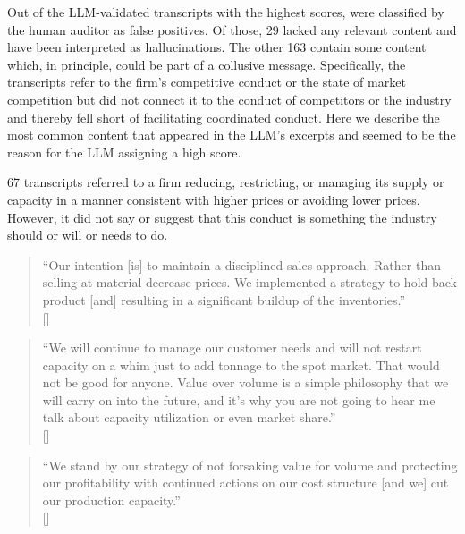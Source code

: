 Out of the  LLM-validated transcripts with the highest scores,  were classified by the human auditor as false positives. Of those, 29 lacked any relevant content and have been interpreted as hallucinations. The other 163 contain some content which, in principle, could be part of a collusive message. Specifically, the transcripts refer to the firm's competitive conduct or the state of market competition but did not connect it to the conduct of competitors or the industry and thereby fell short of facilitating coordinated conduct. Here we describe the most common content that appeared in the LLM's excerpts and seemed to be the reason for the LLM assigning a high score.

67 transcripts referred to a firm reducing, restricting, or managing its supply or capacity in a manner consistent with higher prices or avoiding lower prices. However, it did not say or suggest that this conduct is something the industry should or will or needs to do.

\begin{quote}
``Our intention [is] to maintain a disciplined sales approach. Rather than selling at material decrease prices. We implemented a strategy to hold back product [and] resulting in a significant buildup of the inventories.'' \\
\mbox{[]}
\end{quote}

\begin{quote}
``We will continue to manage our customer needs and will not restart capacity on a whim just to add tonnage to the spot market. That would not be good for anyone. Value over volume is a simple philosophy that we will carry on into the future, and it's why you are not going to hear me talk about capacity utilization or even market share.'' \\
\mbox{[]}
\end{quote}

\begin{quote}
``We stand by our strategy of not forsaking value for volume and protecting our profitability with continued actions on our cost structure [and we] cut our production capacity.'' \\
\mbox{[]}
\end{quote}

